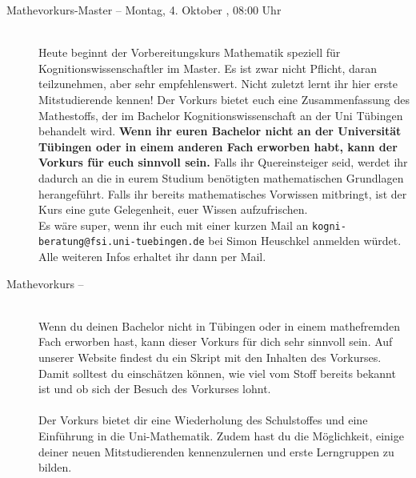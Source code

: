 \begin{description}


\ifkogwiss
    \ifmaster
        \item[Mathevorkurs-Master -- Montag, 4. Oktober \YEAR, 08:00 Uhr]\ \\
        Heute beginnt der Vorbereitungskurs Mathematik speziell für Kognitionswissenschaftler im Master. Es ist zwar nicht Pflicht, daran teilzunehmen, aber sehr empfehlenswert. Nicht zuletzt lernt ihr hier erste Mitstudierende kennen! Der Vorkurs bietet euch eine Zusammenfassung des Mathestoffs, der im Bachelor Kognitionswissenschaft an der Uni Tübingen behandelt wird.
        \textbf{Wenn ihr euren Bachelor nicht an der Universität Tübingen oder in einem anderen Fach erworben habt, kann der Vorkurs für euch sinnvoll sein.} Falls ihr Quereinsteiger seid, werdet ihr dadurch an die in eurem Studium benötigten mathematischen Grundlagen herangeführt. Falls ihr bereits mathematisches Vorwissen mitbringt, ist der Kurs eine gute Gelegenheit, euer Wissen aufzufrischen.\\
         Es wäre super, wenn ihr euch mit einer kurzen Mail an \texttt{kogni-beratung@fsi.uni-tuebingen.de} bei Simon Heuschkel anmelden würdet. Alle weiteren Infos erhaltet ihr dann per Mail.

%
%
    \fi
\fi

\ifmaster
	\ifml %
	\else
		\ifkogwiss %
		\else
			\item[Mathevorkurs -- \mathedatum~\YEAR]~\\
			Wenn du deinen Bachelor nicht in Tübingen oder in einem mathefremden Fach erworben hast, kann dieser Vorkurs für dich sehr sinnvoll sein. Auf unserer Website findest du ein Skript mit den Inhalten des Vorkurses. Damit solltest du einschätzen können, wie viel vom Stoff bereits bekannt ist und ob sich der Besuch des Vorkurses lohnt.\\\\
			Der Vorkurs bietet dir eine Wiederholung des Schulstoffes und eine Einführung in die Uni-Mathematik. Zudem hast du die Möglichkeit, einige deiner neuen Mitstudierenden kennenzulernen und erste Lerngruppen zu bilden.


\end{description}
